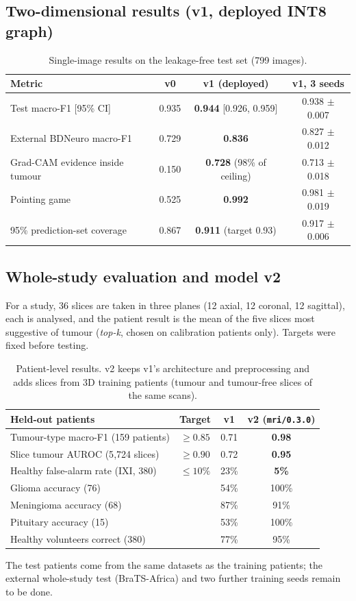 \documentclass[11pt,a4paper]{article}
\begin{document}
\subsection{Two-dimensional results (v1, deployed INT8 graph)}
\begin{table}[H]\centering\small
\begin{tabular}{@{}lccc@{}}
\toprule
\textbf{Metric} & \textbf{v0} & \textbf{v1 (deployed)} & \textbf{v1, 3 seeds} \\
\midrule
Test macro-F1 [95\% CI] & 0.935 & \textbf{0.944} [0.926, 0.959] & 0.938 $\pm$ 0.007 \\
External BDNeuro macro-F1 & 0.729 & \textbf{0.836} & 0.827 $\pm$ 0.012 \\
Grad-CAM evidence inside tumour & 0.150 & \textbf{0.728} (98\% of ceiling) & 0.713 $\pm$ 0.018 \\
Pointing game & 0.525 & \textbf{0.992} & 0.981 $\pm$ 0.019 \\
95\% prediction-set coverage & 0.867 & \textbf{0.911} (target 0.93) & 0.917 $\pm$ 0.006 \\
\bottomrule
\end{tabular}
\caption{Single-image results on the leakage-free test set (799 images).}
\end{table}

\subsection{Whole-study evaluation and model v2}
For a study, 36 slices are taken in three planes (12 axial, 12 coronal, 12 sagittal), each is analysed, and the patient
result is the mean of the five slices most suggestive of tumour (\emph{top-k}, chosen on calibration patients only).
Targets were fixed before testing.
\begin{table}[H]\centering\small
\begin{tabular}{@{}lccc@{}}
\toprule
\textbf{Held-out patients} & \textbf{Target} & \textbf{v1} & \textbf{v2 (\texttt{mri/0.3.0})} \\
\midrule
Tumour-type macro-F1 (159 patients) & $\ge 0.85$ & 0.71 & \textbf{0.98} \\
Slice tumour AUROC (5{,}724 slices) & $\ge 0.90$ & 0.72 & \textbf{0.95} \\
Healthy false-alarm rate (IXI, 380) & $\le 10\%$ & 23\% & \textbf{5\%} \\
\midrule
Glioma accuracy (76) & & 54\% & 100\% \\
Meningioma accuracy (68) & & 87\% & 91\% \\
Pituitary accuracy (15) & & 53\% & 100\% \\
Healthy volunteers correct (380) & & 77\% & 95\% \\
\bottomrule
\end{tabular}
\caption{Patient-level results. v2 keeps v1's architecture and preprocessing and adds slices from 3D training patients
(tumour and tumour-free slices of the same scans).}
\end{table}
The test patients come from the same datasets as the training patients; the external whole-study test (BraTS-Africa)
and two further training seeds remain to be done.
\end{document}
